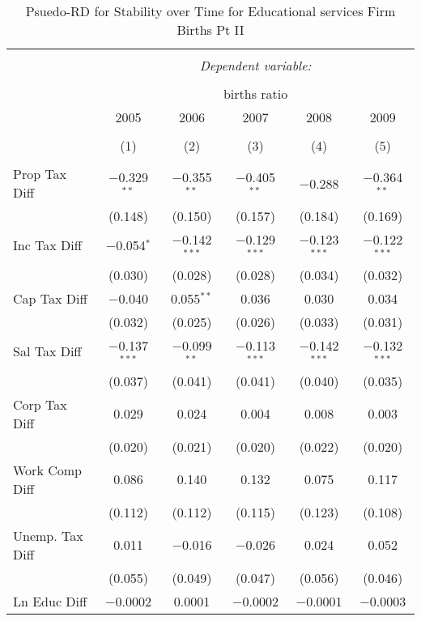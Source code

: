 
\begin{table}[!htbp] \centering 
  \caption{Psuedo-RD for Stability over Time for  Educational services Firm Births Pt II} 
  \label{61year} 
\small 
\begin{tabular}{@{\extracolsep{5pt}}lccccc} 
\\[-1.8ex]\hline 
\hline \\[-1.8ex] 
 & \multicolumn{5}{c}{\textit{Dependent variable:}} \\ 
\cline{2-6} 
\\[-1.8ex] & \multicolumn{5}{c}{births ratio} \\ 
 & 2005 & 2006 & 2007 & 2008 & 2009 \\ 
\\[-1.8ex] & (1) & (2) & (3) & (4) & (5)\\ 
\hline \\[-1.8ex] 
 Prop Tax Diff & $-$0.329$^{**}$ & $-$0.355$^{**}$ & $-$0.405$^{**}$ & $-$0.288 & $-$0.364$^{**}$ \\ 
  & (0.148) & (0.150) & (0.157) & (0.184) & (0.169) \\ 
  Inc Tax Diff & $-$0.054$^{*}$ & $-$0.142$^{***}$ & $-$0.129$^{***}$ & $-$0.123$^{***}$ & $-$0.122$^{***}$ \\ 
  & (0.030) & (0.028) & (0.028) & (0.034) & (0.032) \\ 
  Cap Tax Diff & $-$0.040 & 0.055$^{**}$ & 0.036 & 0.030 & 0.034 \\ 
  & (0.032) & (0.025) & (0.026) & (0.033) & (0.031) \\ 
  Sal Tax Diff & $-$0.137$^{***}$ & $-$0.099$^{**}$ & $-$0.113$^{***}$ & $-$0.142$^{***}$ & $-$0.132$^{***}$ \\ 
  & (0.037) & (0.041) & (0.041) & (0.040) & (0.035) \\ 
  Corp Tax Diff & 0.029 & 0.024 & 0.004 & 0.008 & 0.003 \\ 
  & (0.020) & (0.021) & (0.020) & (0.022) & (0.020) \\ 
  Work Comp Diff & 0.086 & 0.140 & 0.132 & 0.075 & 0.117 \\ 
  & (0.112) & (0.112) & (0.115) & (0.123) & (0.108) \\ 
  Unemp. Tax Diff & 0.011 & $-$0.016 & $-$0.026 & 0.024 & 0.052 \\ 
  & (0.055) & (0.049) & (0.047) & (0.056) & (0.046) \\ 
  Ln Educ Diff & $-$0.0002 & 0.0001 & $-$0.0002 & $-$0.0001 & $-$0.0003 \\ 

\end{tabular}
\end{table}
